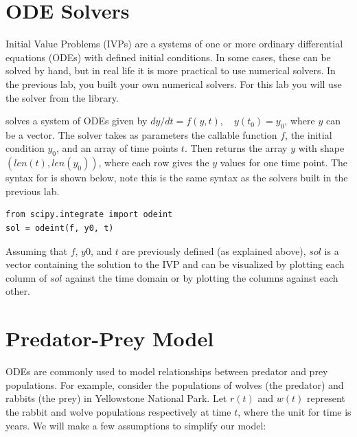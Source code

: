 \label{lab:Weightchange}

\section*{ODE Solvers}
Initial Value Problems (IVPs) are a systems of one or more ordinary differential equations (ODEs) with defined initial conditions. In some cases, these can be solved by hand, but in real life it is more practical to use numerical solvers. In the previous lab, you built your own numerical solvers. For this lab you will use the   solver from the  library.

 solves a system of ODEs given by $dy/dt = f(y, t),\quad y(t_0)=y_0$, where $y$ can be a vector. The solver takes as parameters the callable function $f$, the initial condition $y_0$, and an array of time points $t$. Then  returns the array $y$ with shape $(len(t), len(y_0))$, where each row gives the $y$ values for one time point. The syntax for  is shown below, note this is the same syntax as the solvers built in the previous lab.
\begin{lstlisting}
from scipy.integrate import odeint
sol = odeint(f, y0, t)
\end{lstlisting}
Assuming that $f$, $y0$, and $t$ are previously defined (as explained above), $sol$ is a vector containing the solution to the IVP and can be visualized by plotting each column of $sol$ against the time domain or by plotting the columns against each other.

\section*{Predator-Prey Model} 
ODEs are commonly used to model relationships between predator and prey populations. For example, consider the populations of wolves (the predator) and rabbits (the prey) in Yellowstone National Park. Let $r(t)$ and $w(t)$ represent the rabbit and wolve populations respectively at time $t$, where the unit for time is years. 
We will make a few assumptions to simplify our model:

